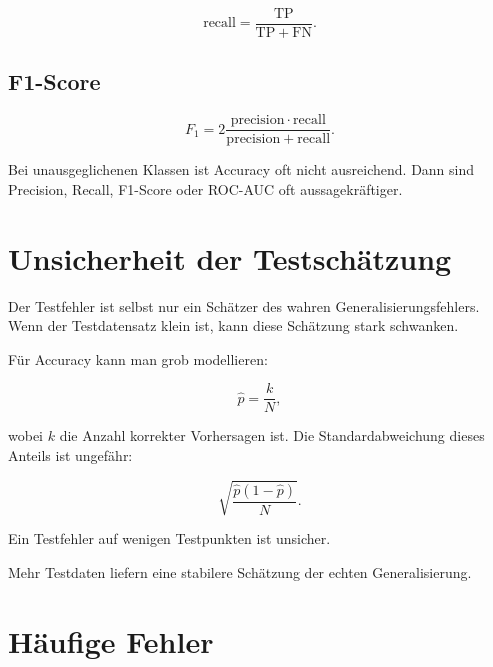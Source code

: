 \[
    \mathrm{recall}
    =
    \frac{\mathrm{TP}}{\mathrm{TP}+\mathrm{FN}}.
\]

\subsection{F1-Score}

\[
    F_1
    =
    2
    \frac{
        \mathrm{precision}\cdot\mathrm{recall}
    }{
        \mathrm{precision}+\mathrm{recall}
    }.
\]

\begin{examtipbox}
Bei unausgeglichenen Klassen ist Accuracy oft nicht ausreichend.
Dann sind Precision, Recall, F1-Score oder ROC-AUC oft aussagekräftiger.
\end{examtipbox}

\section{Unsicherheit der Testschätzung}

Der Testfehler ist selbst nur ein Schätzer des wahren Generalisierungsfehlers.
Wenn der Testdatensatz klein ist, kann diese Schätzung stark schwanken.

Für Accuracy kann man grob modellieren:

\[
    \hat{p}
    =
    \frac{k}{N},
\]

wobei \(k\) die Anzahl korrekter Vorhersagen ist.
Die Standardabweichung dieses Anteils ist ungefähr:

\[
    \sqrt{
        \frac{\hat{p}(1-\hat{p})}{N}
    }.
\]

\begin{conceptbox}
Ein Testfehler auf wenigen Testpunkten ist unsicher.

Mehr Testdaten liefern eine stabilere Schätzung der echten Generalisierung.
\end{conceptbox}

\section{Häufige Fehler}

